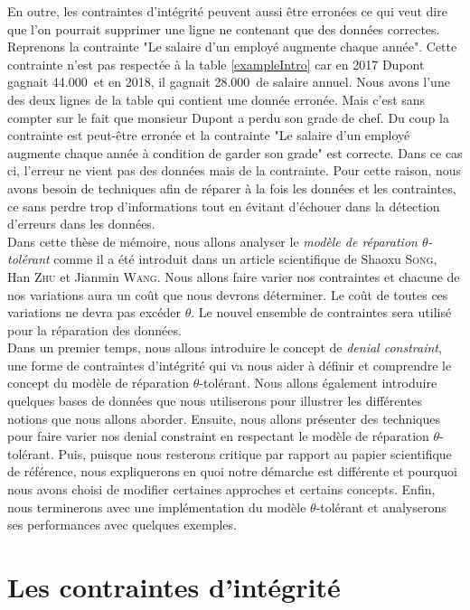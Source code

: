 \documentclass[letterpaper, 12pt]{report}
\theoremstyle{definition}
\begin{document}
En outre, les contraintes d'intégrité peuvent aussi être erronées ce qui veut dire que l'on pourrait supprimer une ligne ne contenant que des données correctes. Reprenons la contrainte "Le salaire d'un employé augmente chaque année". Cette contrainte n'est pas respectée à la table \ref{exampleIntro} car en 2017 Dupont gagnait 44.000\texteuro\, et en 2018, il gagnait 28.000\texteuro\,  de salaire annuel. Nous avons l'une des deux lignes de la table qui contient une donnée erronée. Mais c'est sans compter sur le fait que monsieur Dupont a perdu son grade de chef. Du coup la contrainte est peut-être erronée et la contrainte "Le salaire d'un employé augmente chaque année à condition de garder son grade" est correcte. Dans ce cas ci, l'erreur ne vient pas des données mais de la contrainte. Pour cette raison, nous avons besoin de techniques afin de réparer à la fois les données et les contraintes, ce sans perdre trop d'informations tout en évitant d'échouer dans la détection d'erreurs dans les données.\\

Dans cette thèse de mémoire, nous allons analyser le \emph{modèle de réparation $\theta$-tolérant} comme il a été introduit dans un article scientifique de Shaoxu \textsc{Song}, Han \textsc{Zhu} et Jianmin \textsc{Wang}\cite{main}. Nous allons faire varier nos contraintes et chacune de nos variations aura un coût que nous devrons déterminer. Le coût de toutes ces variations ne devra pas excéder $\theta$. Le nouvel ensemble de contraintes sera utilisé pour la réparation des données.\\

Dans un premier temps, nous allons introduire le concept de \emph{denial constraint}, une forme de contraintes d'intégrité qui va nous aider à définir et comprendre le concept du modèle de réparation $\theta$-tolérant. Nous allons également introduire quelques bases de données que nous utiliserons pour illustrer les différentes notions que nous allons aborder. Ensuite, nous allons présenter des techniques pour faire varier nos denial constraint en respectant le modèle de réparation $\theta$-tolérant. Puis, puisque nous resterons critique par rapport au papier scientifique de référence, nous expliquerons en quoi notre démarche est différente et pourquoi nous avons choisi de modifier certaines approches et certains concepts. Enfin, nous terminerons avec une implémentation du modèle $\theta$-tolérant et analyserons ses performances avec quelques exemples.


\chapter{Les contraintes d'intégrité}
\end{document}

